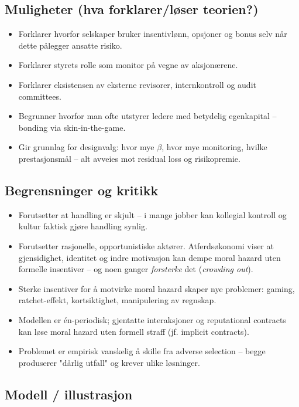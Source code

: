 \subsection*{Muligheter (hva forklarer/løser teorien?)}
\begin{itemize}
\item Forklarer hvorfor selskaper bruker insentivlønn, opsjoner og bonus selv når dette pålegger ansatte risiko.
\item Forklarer styrets rolle som monitor på vegne av aksjonærene.
\item Forklarer eksistensen av eksterne revisorer, internkontroll og audit committees.
\item Begrunner hvorfor man ofte utstyrer ledere med betydelig egenkapital -- bonding via skin-in-the-game.
\item Gir grunnlag for designvalg: hvor mye $\beta$, hvor mye monitoring, hvilke prestasjonsmål -- alt avveies mot residual loss og risikopremie.
\end{itemize}

\subsection*{Begrensninger og kritikk}
\begin{itemize}
\item Forutsetter at handling er skjult -- i mange jobber kan kollegial kontroll og kultur faktisk gjøre handling synlig.
\item Forutsetter rasjonelle, opportunistiske aktører. Atferdsøkonomi viser at gjensidighet, identitet og indre motivasjon kan dempe moral hazard uten formelle insentiver -- og noen ganger \emph{forsterke} det (\emph{crowding out}).
\item Sterke insentiver for å motvirke moral hazard skaper nye problemer: gaming, ratchet-effekt, kortsiktighet, manipulering av regnskap.
\item Modellen er én-periodisk; gjentatte interaksjoner og reputational contracts kan løse moral hazard uten formell straff (jf. implicit contracts).
\item Problemet er empirisk vanskelig å skille fra adverse selection -- begge produserer "dårlig utfall" og krever ulike løsninger.
\end{itemize}

\subsection*{Modell / illustrasjon}

